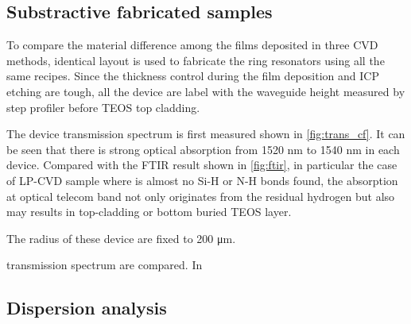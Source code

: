 \subsection{Substractive fabricated samples}

To compare the material difference among the films deposited in three CVD methods, identical layout is used to fabricate the ring resonators using all the same recipes. %
Since the thickness control during the film deposition and ICP etching are tough, all the device are label with the waveguide height measured by step profiler before TEOS top cladding.

The device transmission spectrum is first measured shown in \autoref{fig:trans_cf}. It can be seen that there is strong optical absorption from 1520 nm to 1540 nm in each device. Compared with the FTIR result shown in \autoref{fig:ftir}, in particular the case of LP-CVD sample where is almost no Si-H or N-H bonds found, the absorption at optical telecom band not only originates from the residual hydrogen but also may results in top-cladding or bottom buried TEOS layer.

 The radius of these device are fixed to 200 \si{\um}.

 transmission spectrum are compared. In 

\begin{figure}
	\centering
	
	\mycaption{}{}
	\label{fig:trans_cf}
\end{figure}



\subsection{Dispersion analysis}
